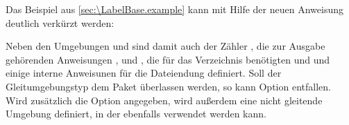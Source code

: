 \begin{Example}
  Das Beispiel aus \autoref{sec:\LabelBase.example} kann mit Hilfe der neuen
  Anweisung deutlich verkürzt werden:
\begin{lstcode}
\end{lstcode}
  Neben den Umgebungen  und 
  sind damit auch der Zähler , die zur Ausgabe gehörenden
  Anweisungen ,  und
  , die für das Verzeichnis benötigten
   und  %
  \iffalse %
  sowie einige intern verwendete Anweisungen mit Bezug auf %
  \else%
  und einige interne Anweisunen für %
  \fi%
  die Dateiendung  definiert. Soll der Gleitumgebungstyp dem Paket
  überlassen werden, so kann Option  
  entfallen. Wird zusätzlich die Option  angegeben, wird
  außerdem eine nicht gleitende Umgebung  definiert,
  in der ebenfalls  verwendet
  werden kann.


\end{Example}
